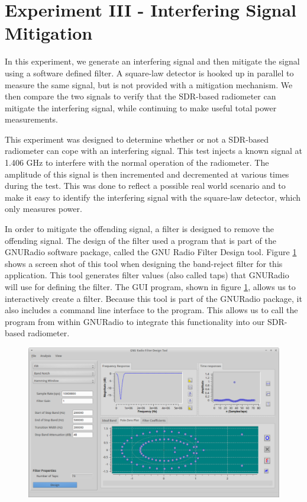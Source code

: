 \section{Experiment III - Interfering Signal Mitigation}\label{Exp3}

In this experiment, we generate an interfering signal and then mitigate the signal using a software defined filter.  A square-law detector is hooked up in parallel to measure the same signal, but is not provided with a mitigation mechanism.  We then compare the two signals to verify that the SDR-based radiometer can mitigate the interfering signal, while continuing to make useful total power measurements.

This experiment was designed to determine whether or not a SDR-based radiometer can cope with an interfering signal.  This test injects a known signal at 1.406 GHz to interfere with the normal operation of the radiometer.  The amplitude of this signal is then incremented and decremented at various times during the test.  This was done to reflect a possible real world scenario and to make it easy to identify the interfering signal with the square-law detector, which only measures power.  

In order to mitigate the offending signal, a filter is designed to remove the offending signal.  The design of the filter used a program that is part of the GNURadio software package, called the GNU Radio Filter Design tool.  Figure \ref{GRC_Filter_DSN} shows a screen shot of this tool when designing the band-reject filter for this application.  This tool generates filter values (also called taps) that GNURadio will use for defining the filter.  The GUI program, shown in figure \ref{GRC_Filter_DSN}, allows us to interactively create a filter.  Because this tool is part of the GNURadio package, it also includes a command line interface to the program.  This allows us to call the program from within GNURadio to integrate this functionality into our SDR-based radiometer.  

\begin{figure}[h!tb] \centering
\includegraphics[width=\textwidth]{Images/GNURadio_Filter_dsn.png}
\label{GRC_Filter_DSN}
\end{figure}  

